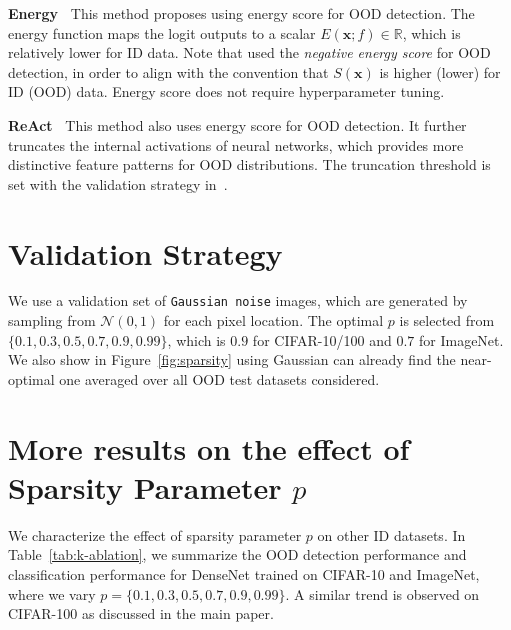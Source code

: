 \documentclass[runningheads]{llncs}
\def\*#1{\mathbf{#1}}
\begin{document}
\noindent \textbf{Energy~\cite{liu2020energy}}  This method proposes using energy score for OOD detection. The energy function  maps the logit outputs to a scalar $E(\*x; f) \in \mathbb{R}$, which is relatively lower for ID data.\@
Note that \cite{liu2020energy} used the \emph{negative energy score} for OOD detection, in order to align with the convention that $S(\*x)$ is higher (lower) for ID (OOD) data. Energy score does not require hyperparameter tuning. 

\noindent \textbf{ReAct~\cite{sun2021react}} This method also uses energy score for OOD detection. It further truncates the internal activations of neural networks, which provides more distinctive feature patterns for OOD distributions. The truncation threshold is set with the validation strategy in~\cite{sun2021react}.


\section{Validation Strategy}
\label{app:val}
We use a validation set of \texttt{Gaussian noise} images, which are generated by sampling from $\mathcal{N}(0,1)$ for each pixel location.
The optimal $p$ is selected from $\{0.1,0.3, 0.5,0.7,0.9,0.99\}$, which is $0.9$ for CIFAR-10/100 and $0.7$ for ImageNet.
We also show in Figure~\ref{fig:sparsity} using Gaussian can already find the near-optimal one averaged over all OOD test datasets considered. 




\section{More results on the effect of Sparsity Parameter $p$ } 
\label{sec:ood-sparsep}
We characterize  the effect of sparsity parameter $p$ on other ID datasets.  In Table~\ref{tab:k-ablation}, we summarize the OOD detection performance and classification performance for DenseNet trained on CIFAR-10 and ImageNet, where we vary $p=\{0.1, 0.3, 0.5, 0.7, 0.9, 0.99\}$. A similar trend is observed on CIFAR-100 as discussed in the main paper. 
\end{document}
